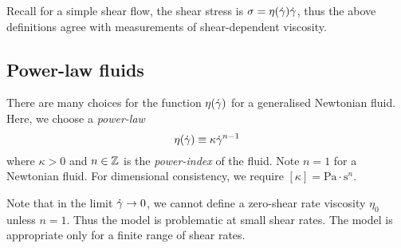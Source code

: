 \documentclass{jknotes}
\begin{document}
Recall for a simple shear flow, the shear stress is $\sigma =
\eta(\dot{\gamma})\dot{\gamma}$, thus the above definitions agree with measurements of
shear-dependent viscosity.

\subsection{Power-law fluids}
There are many choices for the function $\eta(\dot{\gamma})$ for a generalised
Newtonian fluid. Here, we choose a \emph{power-law}
\begin{equation}
	\eta(\dot{\gamma}) \equiv \kappa \dot{\gamma}^{n-1}
\end{equation}
where $\kappa > 0$ and $n \in \mathbb{Z}$ is the \emph{power-index} of the fluid.
Note $n=1$ for a Newtonian fluid. For dimensional consistency, we require
$\left[\kappa\right] = \text{Pa}\cdot\text{s}^n$.

\begin{center}
\end{center}

Note that in the limit $\dot{\gamma} \to 0$, we cannot define a zero-shear rate
viscosity $\eta_0$ unless $n=1$. Thus the model is problematic at small shear
rates. The model is appropriate only for a finite range of shear rates.
\end{document}
